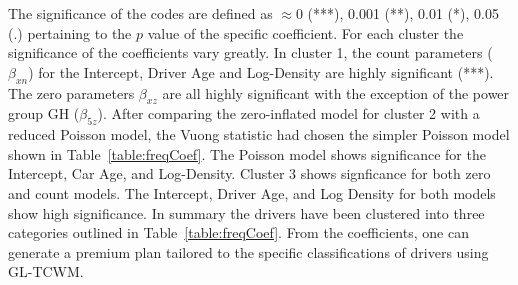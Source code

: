 \documentclass[11pt,letterpaper]{article}
\numberwithin{equation}{section}
\numberwithin{equation}{section}
\numberwithin{equation}{section}
\begin{document}
The significance of the codes are defined as $\approx 0$  (***), 0.001 (**), 0.01 (*), 0.05 (.) %
pertaining to the $p$ value of the specific coefficient. For each cluster the significance of the coefficients vary greatly. In cluster 1, the count parameters ($\beta_{xn}$) for the Intercept, Driver Age and Log-Density are highly significant (***). The zero parameters $\beta_{xz}$ are all highly significant with the exception of the power group GH ($\beta_{5z}$). After comparing the zero-inflated model for cluster 2 with a reduced Poisson model, the Vuong statistic had chosen the simpler Poisson model shown in Table~\ref{table:freqCoef}. The Poisson model shows significance for the Intercept, Car Age, and Log-Density. Cluster 3 shows signficance for both zero and count models. The Intercept, Driver Age, and Log Density for both models show high significance.
In summary the drivers have been clustered into three categories outlined in Table~\ref{table:freqCoef}. From the coefficients, one can generate a premium plan tailored to the specific classifications of drivers using GL-TCWM.
\end{document}

